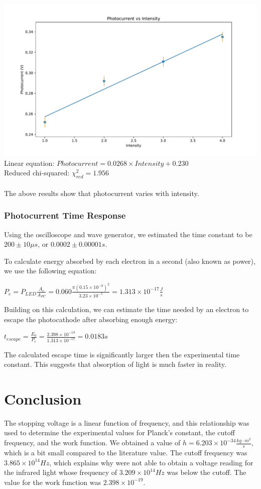 \documentclass[a4paper, 11pt]{article}
\begin{document}
\includegraphics[width=\textwidth]{photo_inten.pdf}
Linear equation: $Photocurrent = 0.0268 \times Intensity + 0.230$ \\
Reduced chi-squared: $\chi^{2}_{red} = 1.956$ \\
\\
The above results show that photocurrent varies with intensity.

\subsubsection*{Photocurrent Time Response}
Using the oscilloscope and wave generator, we estimated the time constant to be $200 \pm 10\mu s$, or $0.0002 \pm 0.00001 s$.

To calculate energy absorbed by each electron in a second (also known as power), we use the following equation:
\begin{center}
$P_e = P_{LED}\frac{A_{e}}{A_{PC}} = 0.060 \frac{\pi(0.15 \times 10^{-9})^2}{3.23 \times 10^{-5}} = 1.313 \times 10^{-17} \frac{J}{s}$
\end{center}
Building on this calculation, we can estimate the time needed by an electron to escape the photocathode after absorbing enough energy:
\begin{center}
$t_{escape} = \frac{E_0}{P_e} = \frac{2.398 \times 10^{-19}}{1.313 \times 10^{-17}} = 0.0183s$
\end{center}
The calculated escape time is significantly larger then the experimental time constant. This suggests that absorption of light is much faster in reality.

\section*{Conclusion}
The stopping voltage is a linear function of frequency, and this relationship was used to determine the experimental values for Planck's constant, the cutoff frequency, and the work function. We obtained a value of $ h = 6.203 \times 10^{-34} \frac{kg \cdot m^2}{s}$, which is a bit small compared to the literature value. The cutoff frequency was $3.865 \times 10^{14} Hz$, which explains why were not able to obtain a voltage reading for the infrared light whose frequency of $3.209 \times 10^{14} Hz$ was below the cutoff. The value for the work function was $2.398 \times 10^{-19}$.
\end{document}
